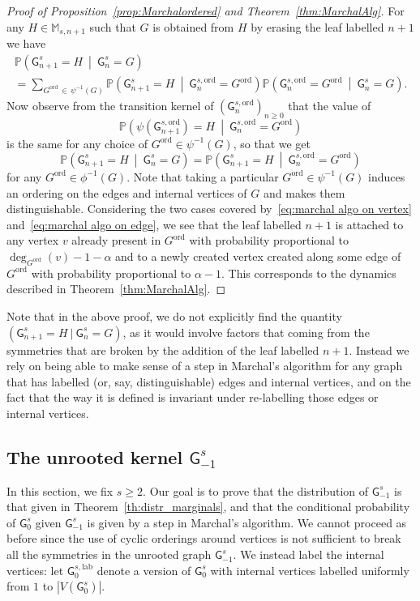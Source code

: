 \documentclass[AHL,Unicode,longabstracts,published]{cedram}
\newcommand{\Pp}[1]{\mathbb{P} \left(#1\right)}
\newcommand{\ord}{\mathrm{ord}}
\newcommand{\lab}{\mathrm{lab}}
\newcommand{\sG}{\mathsf{G}}
\newcommand{\M}{\mathbb{M}}
\begin{document}
\begin{proof}[Proof of Proposition~\ref{prop:Marchalordered} and Theorem~\ref{thm:MarchalAlg}]
For any $H\in \M_{s,n+1}$ such that $G$ is obtained from $H$ by erasing the leaf labelled $n+1$ we have
\begin{multline}\label{eq:formule_probas_totales}
\Pp{\sG^s_{n+1}=H\ \middle|\ \sG^s_{n}=G}\\
=\sum_{G^{\ord}\,\in\,\psi^{-1}(G)}\Pp{\sG^s_{n+1}=H\ \middle|\ \sG^{s,\ord}_{n}=G^{\ord}} \Pp{\sG^{s,\ord}_{n}=G^{\ord} \ \middle|\ \sG^s_{n}=G}.
\end{multline}
Now observe from the transition kernel of $(\sG^{s,\ord}_{n})_{n\geq 0}$ that the value of 
\[
\Pp{\psi\left(\sG^{s,\ord}_{n+1}\right)=H\ \middle|\ \sG^{s,\ord}_{n}=G^{\ord}}
\]
is the same for any choice of $G^{\ord} \in \psi^{-1}(G)$, so that we get
\[
\Pp{\sG^s_{n+1}=H\ \middle|\ \sG^s_{n}=G}=\Pp{\sG^s_{n+1}=H\ \middle|\ \sG^{s,\ord}_{n}=G^{\ord}}
\]
for any $G^{\ord} \in \phi^{-1}(G)$. Note that taking a particular $G^{\ord} \in \psi^{-1}(G)$ induces an ordering on the edges and internal vertices of $G$ and makes them distinguishable. Considering the two cases covered by~\eqref{eq:marchal algo on vertex} and~\eqref{eq:marchal algo on edge}, we see that the leaf labelled $n+1$ is attached to any vertex $v$ already present in $G^\ord$ with probability proportional to $\deg_{G^{\ord}}(v) -1-\alpha$ and to a newly created vertex created along some edge of $G^\ord$ with probability proportional to $\alpha -1$. This corresponds to the dynamics described in Theorem~\ref{thm:MarchalAlg}.
\end{proof}


\begin{rema}
Note that in the above proof, we do not explicitly find the quantity $(\sG^s_{n+1}=H\ |\ \sG^s_{n}=G)$, as it would involve factors that coming from the symmetries that are broken by the addition of the leaf labelled $n+1$. Instead we rely on being able to make sense of a step in Marchal's algorithm for any graph that has labelled (or, say, distinguishable) edges and internal vertices, and on the fact that the way it is defined is invariant under re-labelling those edges or internal vertices.
\end{rema}


\subsection{The unrooted kernel \texorpdfstring{$\sG_{-1}^s$}{mathsf G-1s}}\label{sec:unrooted}

In this section, we fix $s \geq 2$. Our goal is to prove that the distribution of $\sG_{-1}^s$ is that given in Theorem~\ref{th:distr_marginals}, and that the conditional probability of $\sG_{0}^s$ given $\sG_{-1}^s$ is given by a step in Marchal's algorithm. We cannot proceed as before since the use of cyclic orderings around vertices is not sufficient to break all the symmetries in the unrooted graph $\sG^{s}_{-1}$. We instead label the internal vertices: let $\sG_{0}^{s,\lab}$ denote a version of $\sG^s_0$ with internal vertices labelled uniformly from $1$ to $|V(\sG^s_0)|$.
\end{document}
